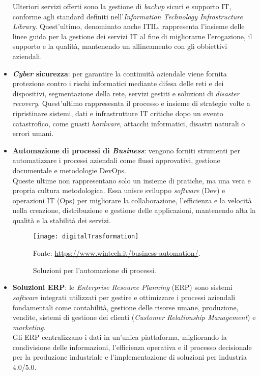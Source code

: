 \begin{itemize}
    Ulteriori servizi offerti sono la gestione di \emph{backup} sicuri e supporto \gls{IT}, conforme agli standard definiti nell'\emph{Information Technology Infrastructure Library}. Quest'ultimo, denominato anche ITIL, rappresenta l'insieme delle linee guida per la gestione dei servizi \gls{IT} al fine di migliorarne l'erogazione, il supporto e la qualità, mantenendo un allineamento con gli obbiettivi aziendali.\\ 
    \item \textbf{\emph{Cyber} sicurezza}: per garantire la continuità aziendale viene fornita protezione contro i rischi informatici mediante difesa delle reti e dei dispositivi, segmentazione della rete, servizi gestiti e soluzioni di \emph{disaster recovery}. Quest'ultimo rappresesnta il processo e insieme di strategie volte a ripristinare sistemi, dati e infrastrutture \gls{IT} critiche dopo un evento catastrofico, come guasti \emph{hardware}, attacchi informatici, disastri naturali o errori umani.\\
	\item \textbf{Automazione di processi di \emph{Business}}: vengono forniti strumenti per automatizzare i processi aziendali come flussi approvativi, gestione documentale e metodologie \gls{DevOps}.\\
    Queste ultime non rappresentano solo un insieme di pratiche, ma una vera e propria cultura metodologica. Essa unisce sviluppo \emph{software} (Dev) e operazioni \gls{IT} (Ops) per migliorare la collaborazione, l'efficienza e la velocità nella creazione, distribuzione e gestione delle applicazioni, mantenendo alta la qualità e la stabilità dei servizi.
	\begin{figure}[htbp] 
        \centering 
        \texttt{[image: digitalTrasformation]}
        \caption{Soluzioni per l'automazione di processi.} 
        \label{fig:digitalTransformation}
        Fonte: \url{https://www.wintech.it/business-automation/}.
    \end{figure}
    \item \textbf{Soluzioni ERP}: le \emph{Enterprise Resource Planning} (ERP) sono sistemi \emph{software} integrati utilizzati per gestire e ottimizzare i processi aziendali fondamentali come contabilità, gestione delle risorse umane, produzione, vendite, sistemi di gestione dei clienti (\emph{Customer Relationship Management}) e \emph{marketing}.\\
    Gli ERP centralizzano i dati in un'unica piattaforma, migliorando la condivisione delle informazioni, l'efficienza operativa e il processo decisionale per la produzione industriale e l'implementazione di soluzioni per industria 4.0/5.0.\\
\end{itemize}
